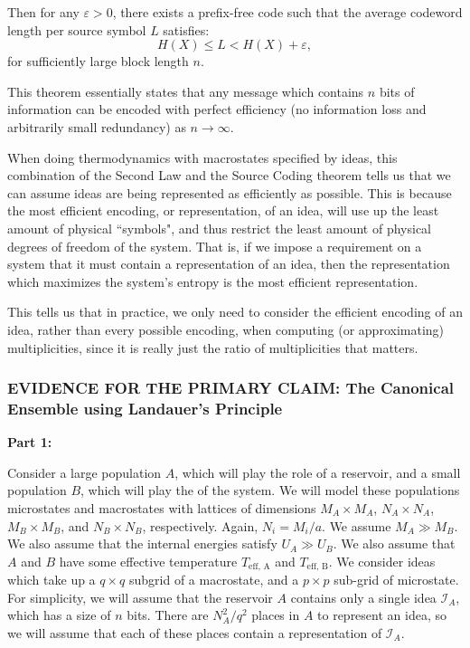 \documentclass{article}
\begin{document}
Then for any \( \varepsilon > 0 \), there exists a prefix-free code such that the average codeword length per source symbol \( L \) satisfies:
\[
H(X) \leq L < H(X) + \varepsilon,
\]
for sufficiently large block length \( n \).

This theorem essentially states that any message which contains $n$ bits of information can be encoded with perfect efficiency (no information loss and arbitrarily small redundancy) as $n\to\infty$.

When doing thermodynamics with macrostates specified by ideas, this combination of the Second Law and the Source Coding theorem tells us that we can assume ideas are being represented as efficiently as possible. This is because the most efficient encoding, or representation, of an idea, will use up the least amount of physical ``symbols", and thus restrict the least amount of physical degrees of freedom of the system. That is, if we impose a requirement on a system that it must contain a representation of an idea, then the representation which maximizes the system's entropy is the most efficient representation.

This tells us that in practice, we only need to consider the efficient encoding of an idea, rather than every possible encoding, when computing (or approximating) multiplicities, since it is really just the ratio of multiplicities that matters.

\subsubsection{EVIDENCE FOR THE PRIMARY CLAIM: The Canonical Ensemble using Landauer's Principle}
\textbf{Part 1:}

Consider a large population $A$, which will play the role of a reservoir, and a small population $B$, which will play the of the system. We will model these populations microstates and macrostates with lattices of dimensions $M_A\times M_A$, $N_A\times N_A$, $M_B\times M_B$, and $N_B\times N_B$, respectively. Again, $N_i = M_i/a$. We assume $M_A\gg M_B$. We also assume that the internal energies satisfy $U_A\gg U_B$. We also assume that $A$ and $B$ have some effective temperature $T_\text{eff, A}$ and $T_\text{eff, B}$. We consider ideas which take up a $q\times q$ subgrid of a macrostate, and a $p\times p$ sub-grid of microstate. For simplicity, we will assume that the reservoir $A$ contains only a single idea $\mathcal{I}_A$, which has a size of $n$ bits. There are $N_A^2/q^2$ places in $A$ to represent an idea, so we will assume that each of these places contain a representation of $\mathcal{I}_A$.
\end{document}
